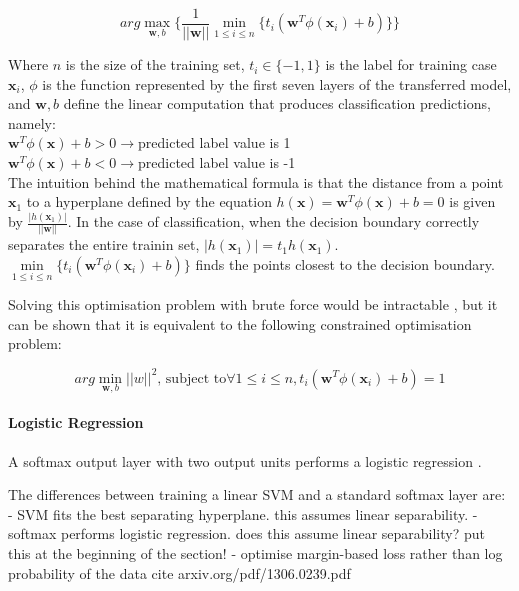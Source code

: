 \documentclass[a4paper,11pt]{article}
\begin{document}
\begin{equation}
arg\max\limits_{\textbf{w},b}\{\frac{1}{||\textbf{w}||} \min\limits_{1 \leq i \leq n}\{t_i (\textbf{w}^T \phi(\textbf{x}_i)+b)\}\}
\end{equation}

Where $n$ is the size of the training set, $t_i \in \{-1,1\}$ is the label for training case $\textbf{x}_i$, $\phi$ is the function represented by the first seven layers of the transferred model, and $\textbf{w},b$ define the linear computation that produces classification predictions, namely: \\

$\textbf{w}^T \phi(\textbf{x}) + b > 0 \rightarrow $predicted label value is 1 \\
$\textbf{w}^T \phi(\textbf{x}) + b < 0 \rightarrow $predicted label value is -1 \\

The intuition behind the mathematical formula is that the distance from a point $\textbf{x}_1$ to a hyperplane defined by the equation $h(\textbf{x}) = \textbf{w}^T \phi(\textbf{x}) + b = 0$ is given by $\frac{|h(\textbf{x}_1)|}{||\textbf{w}||}$. In the case of classification, when the decision boundary correctly separates the entire trainin set, $|h(\textbf{x}_1)| = t_1 h(\textbf{x}_1)$. $\min\limits_{1 \leq i \leq n}\{t_i (\textbf{w}^T \phi(\textbf{x}_i)+b)\}$ finds the points closest to the decision boundary. 

Solving this optimisation problem with brute force would be intractable \cite{ML-book}, but it can be shown that it is equivalent to the following constrained optimisation problem:

\begin{equation}
arg\min \limits_{\textbf{w},b} ||w||^2 \text{, subject to} \forall 1 \leq i \leq n, t_i(\textbf{w}^T \phi(\textbf{x}_i)+b) = 1
\end{equation}



\paragraph{Logistic Regression}
A softmax output layer with two output units performs a logistic regression \cite{ML-book}.  	


The differences between training a linear SVM and a standard softmax layer are:
- SVM fits the best separating hyperplane. this assumes linear separability. 
- softmax performs logistic regression. does this assume linear separability?
put this at the beginning of the section!
- optimise margin-based loss rather than log probability of the data
{cite arxiv.org/pdf/1306.0239.pdf}
\end{document}
